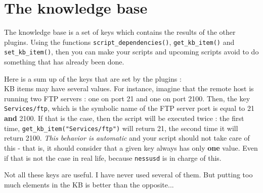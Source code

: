 \documentclass{article}
\begin{document}
\newpage
\appendix
\section{The knowledge base}


The knowledge base is a set of keys which contains the results of the other
plugins. Using the functions \verb+script_dependencies()+, \verb+get_kb_item()+ and \verb+set_kb_item()+, then you can make your scripts and upcoming scripts avoid to do something that has already been done.

Here is a sum up of the keys that are set by the plugins : \\


KB items may have several values. For instance, imagine that
the remote host is running two FTP servers : one on port 21 and one
on port 2100. Then, the key \verb+Services/ftp+, which is the symbolic
name of the FTP server port is equal to 21 \textbf{and} 2100. If that is 
the case, then the script will be executed twice : the first time, 
\verb+get_kb_item("Services/ftp")+ will return 21, the second time
it will return 2100. \textit{This behavior is automatic} and your
script should not take care of this - that is, it should consider
that a given key always has only \textbf{one} value. Even if that is not
the case in real life, because \verb+nessusd+ is in charge of this.


Not all these keys are useful. I have never used several of them. But putting
too much elements in the KB is better than the opposite...
\end{document}
